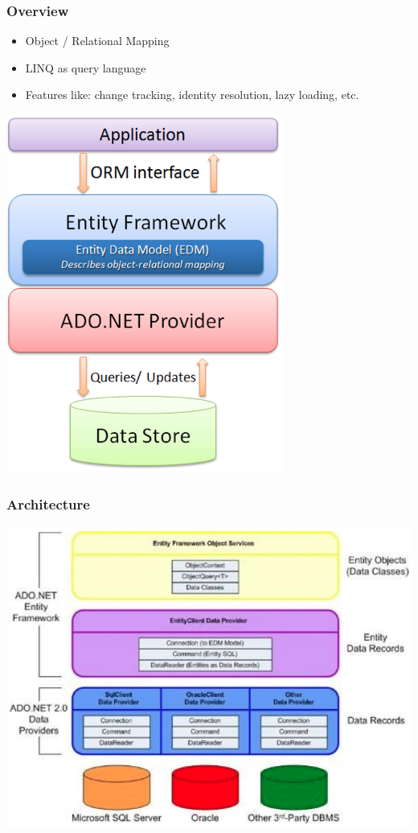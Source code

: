 \documentclass[10pt]{article}
\begin{document}
\subsubsection{Overview}
\begin{itemize}
	\item Object / Relational Mapping
	\item LINQ as query language
	\item Features like: change tracking, identity resolution, lazy loading, etc.
\end{itemize}
\begin{center}
\includegraphics[scale=0.3]{ef_overview.png}
\end{center}
\subsubsection{Architecture}
\begin{center}
\includegraphics[scale=0.4]{ef_architecture.png}
\end{center}
\end{document}
